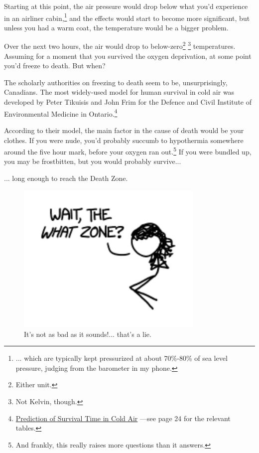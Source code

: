 {{Starting at this point, the air pressure would drop below what you'd experience in an airliner cabin,{\footnote{... which are typically kept pressurized at about 70\%-80\% of sea level pressure, judging from the barometer in my phone.} } and the effects would start to become more significant, but unless you had a warm coat, the temperature would be a bigger problem.}

{Over the next two hours, the air would drop to below-zero{\footnote{Either unit.} } ​{\footnote{Not Kelvin, though.} } temperatures. Assuming for a moment that you survived the oxygen deprivation, at some point you'd freeze to death. But when?}

{The scholarly authorities on freezing to death seem to be, unsurprisingly, Canadians. The most widely-used model for human survival in cold air was developed by Peter Tikuisis and John Frim for the Defence and Civil Institute of Environmental Medicine in Ontario.{\footnote{ \href{http://cradpdf.drdc-rddc.gc.ca/PDFS/zba6/p144967.pdf}{Prediction of Survival Time in Cold Air} —see page 24 for the relevant tables.} } }

{According to their model, the main factor in the cause of death would be your clothes. If you were nude, you'd probably succumb to hypothermia somewhere around the five hour mark, before your oxygen ran out.{\footnote{And frankly, this really raises more questions than it answers.} } If you were bundled up, you may be frostbitten, but you would probably survive...}

{... long enough to reach the Death Zone.}

\begin{figure}[!htbp]
\centering
\includegraphics[scale=0.5, max width=0.8\textwidth]{imgs/a/64/rising_deathzone.png}
\caption{It's not as bad as it sounds!... that's a lie.}
\end{figure}

}

